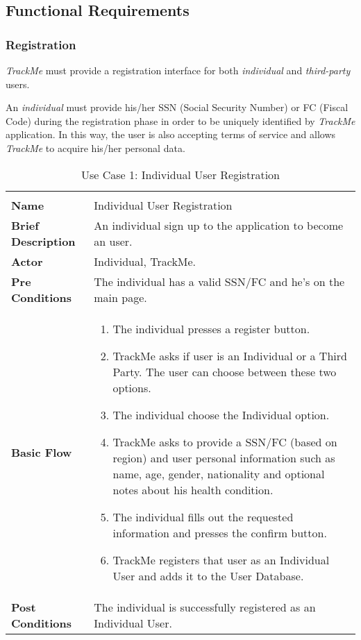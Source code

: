\documentclass[a4paper]{article}
\begin{document}
    \subsection{Functional Requirements}
    
        \subsubsection{Registration}
        \textit{TrackMe} must provide a registration interface for both \textit{individual} and \textit{third-party} users.
        
        An \textit{individual} must provide his/her SSN (Social Security Number) or FC (Fiscal Code) during the registration phase in order to be uniquely identified by \textit{TrackMe} application. In this way, the user is also accepting terms of service and allows \textit{TrackMe} to acquire his/her personal data.
        \begin{longtable}{|p{3cm}|p{8cm}|}
        \endhead
        \caption{\fontsize{10px}{0mm}\selectfont Use Case 1: Individual User Registration}\\
        \endlastfoot
            \hline
            \textbf{Name} & Individual User Registration \\
            \hline
            \textbf{Brief Description} & An individual sign up to the application to become an user. \\
            \hline
            \textbf{Actor} & Individual, TrackMe. \\
            \hline
            \textbf{Pre Conditions} & The individual has a valid SSN/FC and he's on the main page. \\
            \hline
            \textbf{Basic Flow} &
            \begin{enumerate}
                \setlength{\itemsep}{0pt}
                \item The individual presses a register button.
                \item TrackMe asks if user is an Individual or a Third Party. The user can choose between these two options.
                \item The individual choose the Individual option.
                \item TrackMe asks to provide a SSN/FC (based on region) and user personal information such as name, age, gender, nationality and optional notes about his health condition.
                \item The individual fills out the requested information and presses the confirm button.
                \item TrackMe registers that user as an Individual User and adds it to the User Database. 
            \end{enumerate} \\
            \hline
            \textbf{Post Conditions} & The individual is successfully registered as an Individual User. \\
            \hline
        \end{longtable}
        
\end{document}
